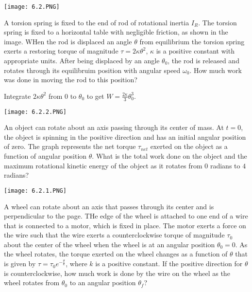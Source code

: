 \documentclass[../mech.tex]{subfiles}
\begin{document}
\begin{example}
    \begin{center}
        \texttt{[image: 6.2.PNG]}
    \end{center}
    A torsion spring is fixed to the end of rod of rotational inertia $I_R$. The torsion spring is fixed to a horizontal table with negligible friction, as shown in the image. WHen the rod is displaced an angle $\theta$ from equilibrium 
    the torsion spring exerts a restoring torque of magnitude $\tau = 2\kappa \theta^2$, $\kappa$ is a positive constant with appropriate units. After being displaced by an angle $\theta_0$, the rod is released and rotates through its equilibruim position with angular speed 
    $\omega_0$. How much work was done in moving the rod to this position?

    Integrate $2\kappa\theta^2$ from $0$ to $\theta_0$ to get $W=\frac{2\kappa}{3}\theta_0^3$.
\end{example}

\ex \begin{center}
    \texttt{[image: 6.2.2.PNG]}
\end{center}
An object can rotate about an axis passing through its center of mass. At $t=0$, the object is spinning in the positive direction and has an initial angular position of zero. The graph represents the net torque $\tau_{net}$ exerted on the object as a function of angular position $\theta$.
What is the total work done on the object and the maximum rotational kinetic energy of the object as it rotates from $0$ radians to $4$ radians?
\pagebreak

\ex \begin{center}
    \texttt{[image: 6.2.1.PNG]}
\end{center}
A wheel can rotate about an axis that passes through its center and is perpendicular to the page. THe edge of the wheel is attached to one end of a wire that is connected to a motor, which is fixed in place.
The motor exerts a force on the wire such that the wire exerts a counterclockwise torque of magnitude $\tau_0$ about the center of the wheel when the wheel is at an angular position $\theta_0=0$. As the wheel rotates,
the torque exerted on the wheel changes as a function of $\theta$ that is given by $\tau = \tau_0 e^{-\frac{\theta}{k}}$, where $k$ is a positive constant. If the positive direction for $\theta$ is counterclockwise, how much work is done by the wire 
on the wheel as the wheel rotates from $\theta_0$ to an angular position $\theta_f$?
\end{document}
